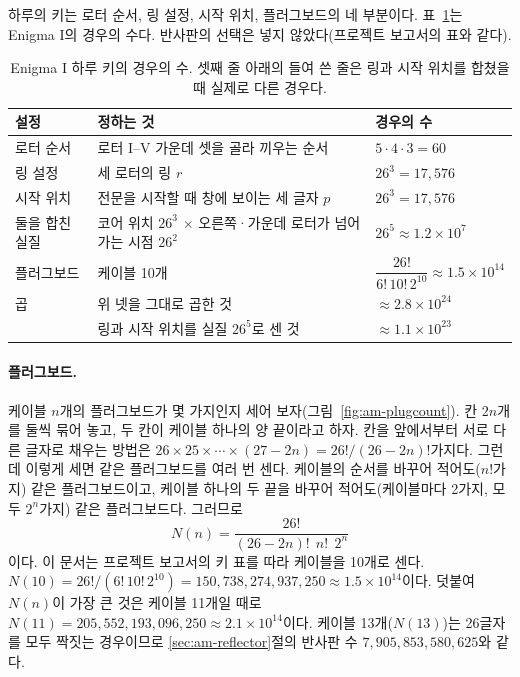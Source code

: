 하루의 키는 로터 순서, 링 설정, 시작 위치, 플러그보드의 네 부분이다. 표~\ref{tab:am-keyspace}는 Enigma I의 경우의
수다. 반사판의 선택은 넣지 않았다(프로젝트 보고서의 표와 같다).

\begin{table}[ht]
\centering
\caption{Enigma I 하루 키의 경우의 수. 셋째 줄 아래의 들여 쓴 줄은 링과 시작 위치를 합쳤을 때 실제로 다른
경우다.}
\label{tab:am-keyspace}
\small
\begin{tabularx}{\linewidth}{l>{\raggedright\arraybackslash}Xl}
\toprule
설정 & 정하는 것 & 경우의 수 \\
\midrule
로터 순서 & 로터 I--V 가운데 셋을 골라 끼우는 순서 & $5 \cdot 4 \cdot 3 = 60$ \\
링 설정 & 세 로터의 링 $r$ & $26^3 = 17{,}576$ \\
시작 위치 & 전문을 시작할 때 창에 보이는 세 글자 $p$ & $26^3 = 17{,}576$ \\
\quad 둘을 합친 실질 & 코어 위치 $26^3$ $\times$ 오른쪽·가운데 로터가 넘어가는 시점 $26^2$ & $26^5 \approx 1.2\times10^{7}$ \\
플러그보드 & 케이블 10개 & \rule[-2.2ex]{0pt}{5.6ex}$\dfrac{26!}{6!\,10!\,2^{10}} \approx 1.5\times10^{14}$ \\
\midrule
곱 & 위 넷을 그대로 곱한 것 & $\approx 2.8\times10^{24}$ \\
 & 링과 시작 위치를 실질 $26^5$로 센 것 & $\approx 1.1\times10^{23}$ \\
\bottomrule
\end{tabularx}
\end{table}

\paragraph{플러그보드.} 케이블 $n$개의 플러그보드가 몇 가지인지 세어 보자(그림~\ref{fig:am-plugcount}). 칸 $2n$개를
둘씩 묶어 놓고, 두 칸이 케이블 하나의 양 끝이라고 하자. 칸을 앞에서부터 서로 다른 글자로 채우는 방법은
$26 \times 25 \times \cdots \times (27-2n) = 26!/(26-2n)!$가지다. 그런데 이렇게 세면 같은 플러그보드를 여러 번 센다.
케이블의 순서를 바꾸어 적어도($n!$가지) 같은 플러그보드이고, 케이블 하나의 두 끝을 바꾸어 적어도(케이블마다 2가지,
모두 $2^n$가지) 같은 플러그보드다. 그러므로
\begin{equation}
  N(n) = \frac{26!}{(26-2n)!\;\, n!\;\, 2^{n}} \label{eq:am-plugcount}
\end{equation}
이다. 이 문서는 프로젝트 보고서의 키 표를 따라 케이블을 10개로 센다.
$N(10) = 26!/(6!\,10!\,2^{10}) = 150{,}738{,}274{,}937{,}250 \approx 1.5 \times 10^{14}$이다. 덧붙여 $N(n)$이 가장 큰
것은 케이블 11개일 때로 $N(11) = 205{,}552{,}193{,}096{,}250 \approx 2.1\times10^{14}$이다. 케이블 13개($N(13)$)는
26글자를 모두 짝짓는 경우이므로 \ref{sec:am-reflector}절의 반사판 수 $7{,}905{,}853{,}580{,}625$와 같다.

